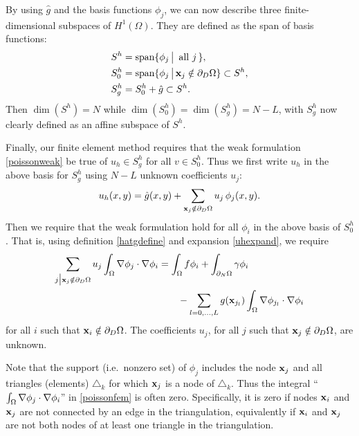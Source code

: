 By using $\hat g$ and the basis functions $\phi_j$, we can now describe three finite-dimensional subspaces of $H^1(\Omega)$.  They are defined as the span of basis functions:
\begin{align*}
S^h &= \operatorname{span}\{\phi_j \,\big|\, \text{ all } j\,\}, \\
S_0^h &= \operatorname{span}\{\phi_j \,\big|\, \mathbf{x}_j \notin \partial_D \Omega\} \subset S^h, \\
S_g^h &= S_0^h + \hat g \subset S^h.
\end{align*}
Then $\dim(S^h)=N$ while $\dim(S_0^h)=\dim(S_g^h)=N-L$, with $S_g^h$ now clearly defined as an affine subspace of $S^h$.

Finally, our finite element method requires that the weak formulation  \eqref{poissonweak} be true of $u_h\in S_g^h$ for all $v\in S_0^h$.  Thus we first write $u_h$ in the above basis for $S_g^h$ using $N-L$ unknown coefficients $u_j$:
\begin{equation}
u_h(x,y) = \hat g(x,y) + \sum_{\mathbf{x}_j \notin \partial_D \Omega} u_j\, \phi_j(x,y). \label{uhexpand}
\end{equation}
Then we require that the weak formulation hold for all $\phi_i$ in the above basis of $S_0^h$.  That is, using definition \eqref{hatgdefine} and expansion \eqref{uhexpand}, we require
\begin{align}
\sum_{j\big|\mathbf{x}_j \notin \partial_D \Omega} u_j \int_\Omega \nabla \phi_j \cdot \nabla \phi_i &= \int_\Omega f \phi_i + \int_{\partial_N\Omega} \gamma \phi_i \label{poissonfem} \\
&\qquad - \sum_{l=0,\dots,L} g(\mathbf{x}_{j_l})  \int_\Omega \nabla \phi_{j_l} \cdot \nabla \phi_i \notag
\end{align}
for all $i$ such that $\mathbf{x}_i \notin \partial_D \Omega$.  The coefficients $u_j$, for all $j$ such that $\mathbf{x}_j \notin \partial_D \Omega$, are unknown.

Note that the support (i.e.~nonzero set) of $\phi_j$ includes the node $\mathbf{x}_j$ and all triangles (elements) $\triangle_k$ for which $\mathbf{x}_j$ is a node of $\triangle_k$.  Thus the integral ``$\int_\Omega \nabla \phi_j \cdot \nabla \phi_i$'' in \eqref{poissonfem} is often zero.  Specifically, it is zero if nodes $\mathbf{x}_i$ and $\mathbf{x}_j$ are not connected by an edge in the triangulation, equivalently if $\mathbf{x}_i$ and $\mathbf{x}_j$ are not both nodes of at least one triangle in the triangulation.



